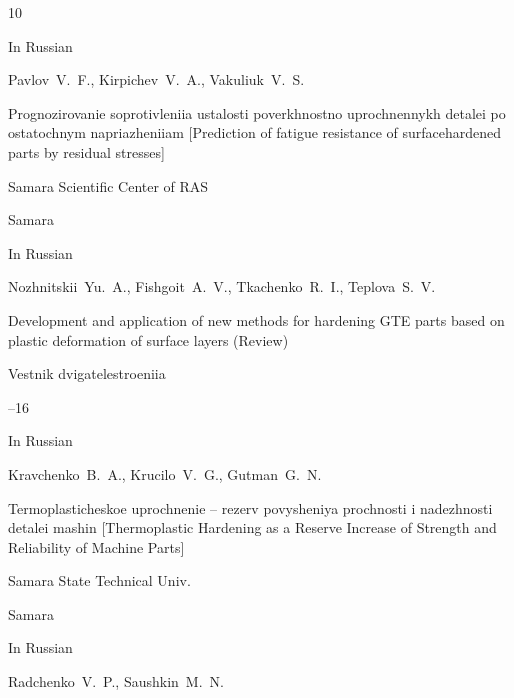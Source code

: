 \begin{thebibliography}{10}


\lang In Russian

\by Pavlov~V.~F., Kirpichev~V.~A., Vakuliuk~V.~S.

\book Prognozirovanie soprotivleniia ustalosti poverkhnostno uprochnennykh detalei po ostatochnym napriazheniiam \rm [Prediction of fatigue resistance of surfacehardened parts by residual stresses]



\publ Samara Scientific Center of RAS

\publaddr Samara







\lang In Russian

\by Nozhnitskii~Yu.~A., Fishgoit~A.~V., Tkachenko~R.~I., Teplova~S.~V.

\paper Development and application of new methods for hardening GTE parts based on plastic deformation of surface layers (Review)

\jour Vestnik dvigatelestroeniia



--16







\lang In Russian

\by Kravchenko~B.~A., Krucilo~V.~G., Gutman~G.~N.

\book Termoplasticheskoe uprochnenie – rezerv povysheniya prochnosti i nadezhnosti detalei mashin \rm [Thermoplastic Hardening as a Reserve Increase of Strength and Reliability of Machine Parts]



\publ Samara State Technical Univ.

\publaddr Samara





\lang In Russian

\by Radchenko~V.~P., Saushkin~M.~N.


\end{thebibliography}
